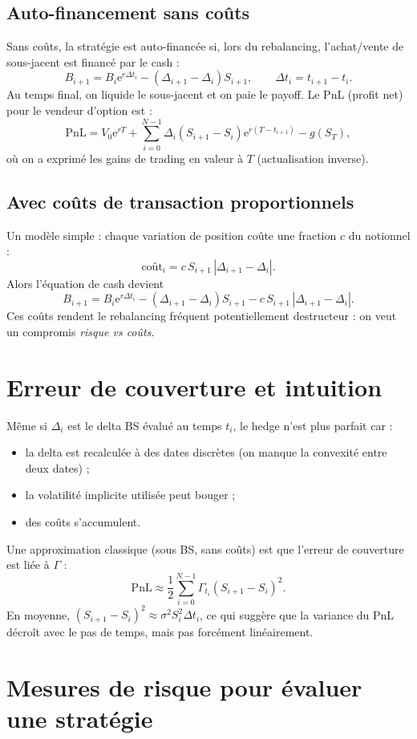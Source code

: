 \documentclass[11pt,a4paper]{report}
\newcommand{\ee}{\mathrm{e}}
\newcommand{\1}{\mathbbm{1}}
\newcommand{\abs}[1]{\left|#1\right|}
\newcommand{\PnL}{\mathrm{PnL}}
\theoremstyle{definition}
\theoremstyle{plain}
\theoremstyle{remark}
\begin{document}
\subsection{Auto-financement sans coûts}
Sans coûts, la stratégie est auto-financée si, lors du rebalancing,
l'achat/vente de sous-jacent est financé par le cash :
\[
B_{i+1} = B_i \ee^{r\Delta t_i} - (\Delta_{i+1}-\Delta_i)S_{i+1},
\qquad \Delta t_i=t_{i+1}-t_i.
\]
Au temps final, on liquide le sous-jacent et on paie le payoff.
Le PnL (profit net) pour le vendeur d'option est :
\[
\PnL = V_0\ee^{rT} + \sum_{i=0}^{N-1} \Delta_i (S_{i+1}-S_i)\ee^{r(T-t_{i+1})} - g(S_T),
\]
où on a exprimé les gains de trading en valeur à $T$ (actualisation inverse).

\subsection{Avec coûts de transaction proportionnels}
Un modèle simple : chaque variation de position coûte une fraction $c$ du notionnel :
\[
\text{coût}_i = c\,S_{i+1}\,\abs{\Delta_{i+1}-\Delta_i}.
\]
Alors l'équation de cash devient
\[
B_{i+1} = B_i \ee^{r\Delta t_i} - (\Delta_{i+1}-\Delta_i)S_{i+1} - c\,S_{i+1}\,\abs{\Delta_{i+1}-\Delta_i}.
\]
Ces coûts rendent le rebalancing fréquent potentiellement destructeur : on veut un compromis \emph{risque vs coûts}.

\section{Erreur de couverture et intuition}
Même si $\Delta_i$ est le delta BS évalué au temps $t_i$,
le hedge n'est plus parfait car :
\begin{itemize}
  \item la delta est recalculée à des dates discrètes (on manque la convexité entre deux dates) ;
  \item la volatilité implicite utilisée peut bouger ;
  \item des coûts s'accumulent.
\end{itemize}

Une approximation classique (sous BS, sans coûts) est que l'erreur de couverture est liée à $\Gamma$ :
\[
\PnL \approx \frac12 \sum_{i=0}^{N-1} \Gamma_{t_i} (S_{i+1}-S_i)^2.
\]
En moyenne, $(S_{i+1}-S_i)^2 \approx \sigma^2 S_i^2 \Delta t_i$,
ce qui suggère que la variance du PnL décroît avec le pas de temps, mais pas forcément linéairement.

\section{Mesures de risque pour évaluer une stratégie}
\label{sec:risk_measures_hedge}
\end{document}

